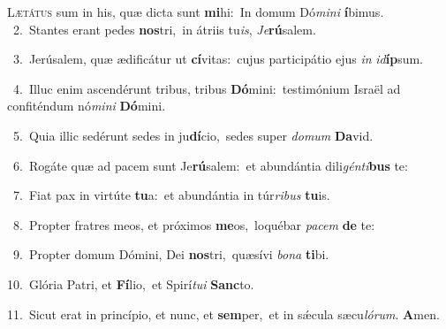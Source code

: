 \lettrine{\initial\textcolor{\initialcolor}{L}}{ætátus} sum in his, quæ dicta sunt \textbf{mi}\-hi:~\star In domum Dó\-\textit{mi}\-\textit{ni} \textbf{í}\-bimus.\\
{\numbfont\textcolor{\numbcolor}{~2.}}~Stantes erant pedes \textbf{nos}\-tri,~\star in átriis tu\-\textit{is}\-, \textit{Je}\-\textbf{rú}salem.\par
{\numbfont\textcolor{\numbcolor}{~3.}}~Jerúsalem, quæ ædificátur ut \textbf{cí}\-vitas:~\star cujus participátio ejus \textit{in} \textit{id}\-\textbf{íp}sum.\par
{\numbfont\textcolor{\numbcolor}{~4.}}~Illuc enim ascendérunt tribus, tribus \textbf{Dó}\-mini:~\star testimónium Israël ad confiténdum nó\-\textit{mi}\-\textit{ni} \textbf{Dó}\-mini.\par
{\numbfont\textcolor{\numbcolor}{~5.}}~Quia illic sedérunt sedes in ju\-\textbf{dí}\-cio,~\star sedes super \textit{do}\-\textit{mum} \textbf{Da}\-vid.\par
{\numbfont\textcolor{\numbcolor}{~6.}}~Rogáte quæ ad pacem sunt Je\-\textbf{rú}\-salem:~\star et abundántia dili\-\textit{gén}\-\textit{ti}\textbf{bus} te:\par
{\numbfont\textcolor{\numbcolor}{~7.}}~Fiat pax in virtúte \textbf{tu}\-a:~\star et abundántia in túr\-\textit{ri}\-\textit{bus} \textbf{tu}\-is.\par
{\numbfont\textcolor{\numbcolor}{~8.}}~Propter fratres meos, et próximos \textbf{me}\-os,~\star loquébar \textit{pa}\-\textit{cem} \textbf{de} te:\par
{\numbfont\textcolor{\numbcolor}{~9.}}~Propter domum Dómini, Dei \textbf{nos}\-tri,~\star quæsívi \textit{bo}\-\textit{na} \textbf{ti}\-bi.\par
{\numbfont\textcolor{\numbcolor}{10.}}~Glória Patri, et \textbf{Fí}\-lio,~\star et Spirí\-\textit{tu}\-\textit{i} \textbf{Sanc}\-to.\par
{\numbfont\textcolor{\numbcolor}{11.}}~Sicut erat in princípio, et nunc, et \textbf{sem}\-per,~\star et in sǽcula sæcu\-\textit{ló}\-\textit{rum}. \textbf{A}\-men.\par
